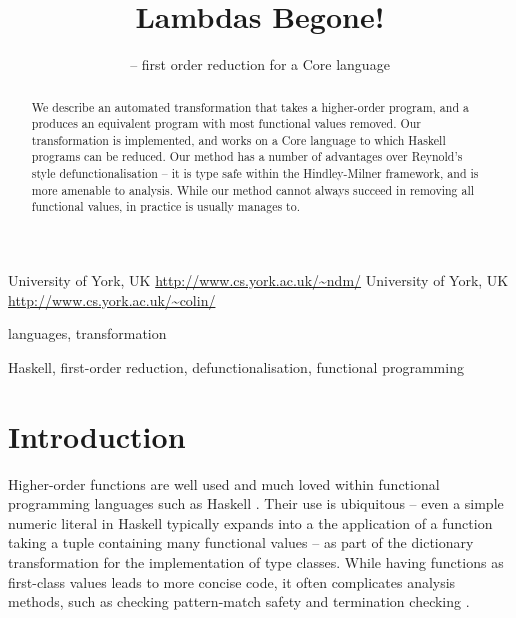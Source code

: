 \documentclass[preprint]{sigplanconf}
\begin{document}
\copyrightdata{[to be supplied]}

\titlebanner{\today{} - \currenttime{}}        %
\preprintfooter{}   %

\title{Lambdas Begone!}
\subtitle{ -- first order reduction for a Core language}

           {University of York, UK}
           {\url{http://www.cs.york.ac.uk/~ndm/}}
           {University of York, UK}
           {\url{http://www.cs.york.ac.uk/~colin/}}

\maketitle

\begin{abstract}
We describe an automated transformation that takes a higher-order program, and a produces an equivalent program with most functional values removed. Our transformation is implemented, and works on a Core language to which Haskell programs can be reduced. Our method has a number of advantages over Reynold's style defunctionalisation -- it is type safe within the Hindley-Milner framework, and is more amenable to analysis. While our method cannot always succeed in removing all functional values, in practice is usually manages to.
\end{abstract}


\terms
languages, transformation

\keywords
Haskell, first-order reduction, defunctionalisation, functional programming

\section{Introduction}

Higher-order functions are well used and much loved within functional programming languages such as Haskell \cite{haskell}. Their use is ubiquitous -- even a simple numeric literal in Haskell typically expands into a the application of a function taking a tuple containing many functional values -- as part of the dictionary transformation for the implementation of type classes. While having functions as first-class values leads to more concise code, it often complicates analysis methods, such as checking pattern-match safety \cite{catch} and termination checking \cite{termination_checking}.
\end{document}
